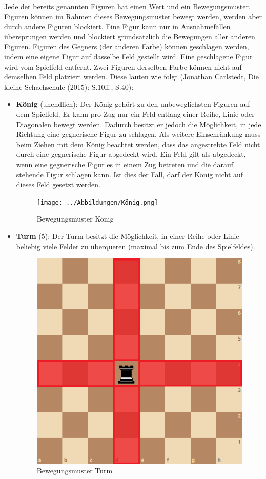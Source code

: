 \documentclass[a4paper,12pt]{article}
\begin{document}
Jede der bereits genannten Figuren hat einen Wert und ein
Bewegungsmuster. Figuren können im Rahmen dieses Bewegungsmuster bewegt
werden, werden aber durch andere Figuren blockiert. Eine Figur kann nur
in Ausnahmefällen übersprungen werden und blockiert grundsätzlich die
Bewegungen aller anderen Figuren. Figuren des Gegners (der anderen
Farbe) können geschlagen werden, indem eine eigene Figur auf dasselbe
Feld gestellt wird. Eine geschlagene Figur wird vom Spielfeld entfernt.
Zwei Figuren derselben Farbe können nicht auf demselben Feld platziert
werden. Diese lauten wie folgt (Jonathan Carlstedt, Die kleine
Schachschule (2015): S.10ff., S.40): 
\begin{itemize}
	\item 
		\textbf{König} (unendlich): Der
		König gehört zu den unbeweglichsten Figuren auf dem Spielfeld. Er kann
		pro Zug nur ein Feld entlang einer Reihe, Linie oder Diagonalen bewegt
		werden. Dadurch besitzt er jedoch die Möglichkeit, in jede Richtung eine
		gegnerische Figur zu schlagen. Als weitere Einschränkung muss beim
		Ziehen mit dem König beachtet werden, dass das angestrebte Feld nicht
		durch eine gegnerische Figur abgedeckt wird. Ein Feld gilt als
		abgedeckt, wenn eine gegnerische Figur es in einem Zug betreten und die
		darauf stehende Figur schlagen kann. Ist dies der Fall, darf der König
		nicht auf dieses Feld gesetzt werden.
		\begin{figure}
			\centering
			\texttt{[image: ../Abbildungen/König.png]} 
			\caption{Bewegungsmuster König}
		\end{figure}
	\item 
		\textbf{Turm} (5): Der Turm
		besitzt die Möglichkeit, in einer Reihe oder Linie beliebig viele Felder
		zu überqueren (maximal bis zum Ende des Spielfeldes).
		
		\begin{figure}
			\centering
			\includegraphics{../Abbildungen/Turm.png} 
			\caption{Bewegungsmuster Turm}
		\end{figure}
	

\end{itemize}
\end{document}
